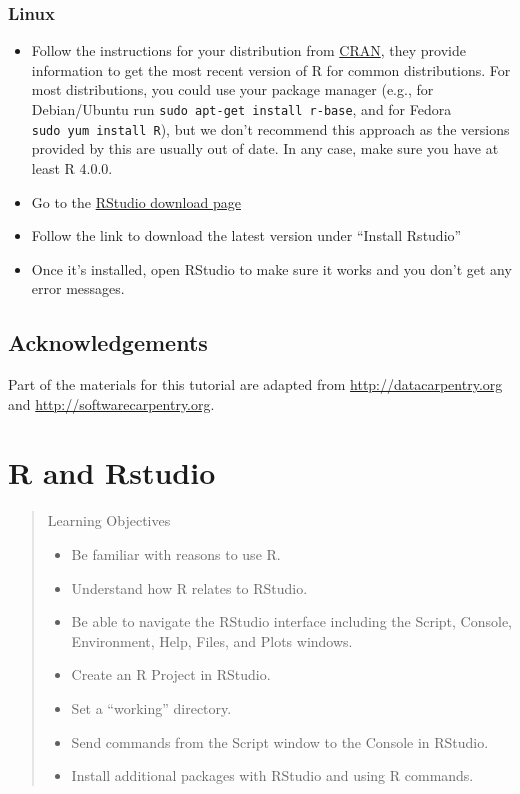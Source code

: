 \documentclass[
]{book}
\providecommand{\tightlist}{%
  \setlength{\itemsep}{0pt}\setlength{\parskip}{0pt}}
\begin{document}
\subsection*{Linux}\label{linux}

\begin{itemize}
\tightlist
\item
  Follow the instructions for your distribution
  from \href{https://cloud.r-project.org/bin/linux}{CRAN}, they provide information
  to get the most recent version of R for common distributions. For most
  distributions, you could use your package manager (e.g., for Debian/Ubuntu run
  \texttt{sudo\ apt-get\ install\ r-base}, and for Fedora \texttt{sudo\ yum\ install\ R}), but we
  don't recommend this approach as the versions provided by this are
  usually out of date. In any case, make sure you have at least R 4.0.0.
\item
  Go to the \href{https://posit.co/download/rstudio-desktop/}{RStudio download page}
\item
  Follow the link to download the latest version under ``Install Rstudio''
\item
  Once it's installed, open RStudio to make sure it works and you don't get any
  error messages.
\end{itemize}

\section*{Acknowledgements}\label{acknowledgements}

Part of the materials for this tutorial are adapted from \url{http://datacarpentry.org} and \url{http://softwarecarpentry.org}.

\chapter{R and Rstudio}\label{backgroud}

\begin{quote}
Learning Objectives

\begin{itemize}
\tightlist
\item
  Be familiar with reasons to use R.
\item
  Understand how R relates to RStudio.
\item
  Be able to navigate the RStudio interface including the Script, Console, Environment, Help, Files, and Plots windows.
\item
  Create an R Project in RStudio.
\item
  Set a ``working'' directory.
\item
  Send commands from the Script window to the Console in RStudio.
\item
  Install additional packages with RStudio and using R commands.
\end{itemize}
\end{quote}
\end{document}
